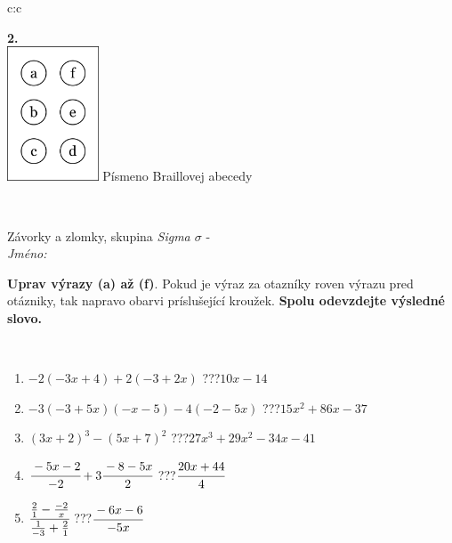 \documentclass[10pt]{report}
\begin{document}
\begin{tabular}{c:c}
\begin{minipage}[c][104.5mm][t]{0.5\linewidth}
\begin{center}
\begin{minipage}{0.20\linewidth}
\begin{center}
{\Huge\bfseries 2.} \\[2mm]
\includegraphics[height=40mm]{../images/braille.png}
{\small Písmeno Braillovej abecedy}
\end{center}
\end{minipage}
\end{center}
\end{minipage}
\\ \hdashline
\begin{minipage}[c][104.5mm][t]{0.5\linewidth}
\begin{center}
\vspace{7mm}
{\huge Závorky a zlomky, skupina \textit{Sigma $\sigma$} -}\\[5mm]
\textit{Jméno:}\phantom{xxxxxxxxxxxxxxxxxxxxxxxxxxxxxxxxxxxxxxxxxxxxxxxxxxxxxxxxxxxxxxxxx}\\[5mm]
\begin{minipage}{0.95\linewidth}
\begin{center}
\textbf{Uprav výrazy (a) až (f)}. Pokud je výraz za otazníky roven výrazu pred otázniky, tak napravo obarvi príslušející kroužek. \textbf{Spolu odevzdejte výsledné slovo.}
\end{center}
\end{minipage}
\\[1mm]
\begin{minipage}{0.79\linewidth}
\begin{center}
\begin{varwidth}{\linewidth}
\begin{enumerate}
\normalsize
\item $-2(-3x+4)+2(-3+2x)$\quad \dotfill\; ???\;\dotfill \quad $10x-14$
\item $-3(-3+5x)(-x-5)-4(-2-5x)$\quad \dotfill\; ???\;\dotfill \quad $15x^2+86x-37$
\item $(3x+2)^3-(5x+7)^2$\quad \dotfill\; ???\;\dotfill \quad $27x^3+29x^2-34x-41$
\item $\cfrac{-5x-2}{-2}+3\cfrac{-8-5x}{2}$\quad \dotfill\; ???\;\dotfill \quad $\cfrac{20x+44}{4}$
\item $\cfrac{\frac{2}{1}-\frac{-2}{x}}{\frac{1}{-3}+\frac{2}{1}}$\quad \dotfill\; ???\;\dotfill \quad $\cfrac{-6x-6}{-5x}$

\end{enumerate}
\end{varwidth}
\end{center}
\end{minipage}
\end{center}
\end{minipage}
\end{tabular}
\end{document}
